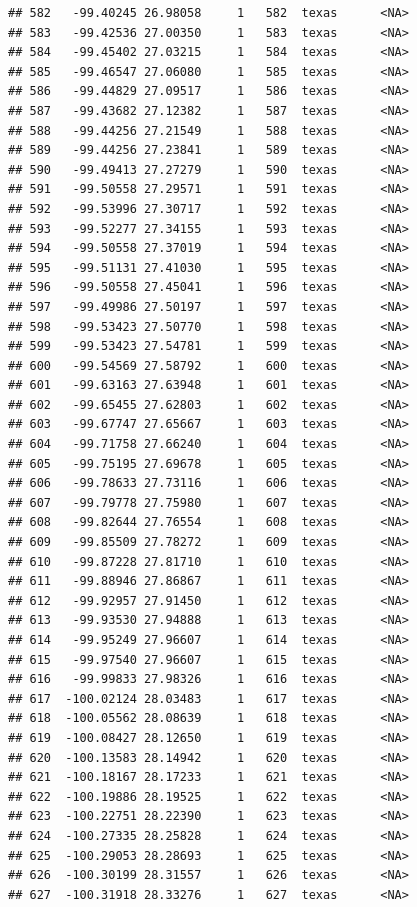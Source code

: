 \documentclass[
]{article}
\begin{document}
\begin{verbatim}
## 582   -99.40245 26.98058     1   582  texas      <NA>
## 583   -99.42536 27.00350     1   583  texas      <NA>
## 584   -99.45402 27.03215     1   584  texas      <NA>
## 585   -99.46547 27.06080     1   585  texas      <NA>
## 586   -99.44829 27.09517     1   586  texas      <NA>
## 587   -99.43682 27.12382     1   587  texas      <NA>
## 588   -99.44256 27.21549     1   588  texas      <NA>
## 589   -99.44256 27.23841     1   589  texas      <NA>
## 590   -99.49413 27.27279     1   590  texas      <NA>
## 591   -99.50558 27.29571     1   591  texas      <NA>
## 592   -99.53996 27.30717     1   592  texas      <NA>
## 593   -99.52277 27.34155     1   593  texas      <NA>
## 594   -99.50558 27.37019     1   594  texas      <NA>
## 595   -99.51131 27.41030     1   595  texas      <NA>
## 596   -99.50558 27.45041     1   596  texas      <NA>
## 597   -99.49986 27.50197     1   597  texas      <NA>
## 598   -99.53423 27.50770     1   598  texas      <NA>
## 599   -99.53423 27.54781     1   599  texas      <NA>
## 600   -99.54569 27.58792     1   600  texas      <NA>
## 601   -99.63163 27.63948     1   601  texas      <NA>
## 602   -99.65455 27.62803     1   602  texas      <NA>
## 603   -99.67747 27.65667     1   603  texas      <NA>
## 604   -99.71758 27.66240     1   604  texas      <NA>
## 605   -99.75195 27.69678     1   605  texas      <NA>
## 606   -99.78633 27.73116     1   606  texas      <NA>
## 607   -99.79778 27.75980     1   607  texas      <NA>
## 608   -99.82644 27.76554     1   608  texas      <NA>
## 609   -99.85509 27.78272     1   609  texas      <NA>
## 610   -99.87228 27.81710     1   610  texas      <NA>
## 611   -99.88946 27.86867     1   611  texas      <NA>
## 612   -99.92957 27.91450     1   612  texas      <NA>
## 613   -99.93530 27.94888     1   613  texas      <NA>
## 614   -99.95249 27.96607     1   614  texas      <NA>
## 615   -99.97540 27.96607     1   615  texas      <NA>
## 616   -99.99833 27.98326     1   616  texas      <NA>
## 617  -100.02124 28.03483     1   617  texas      <NA>
## 618  -100.05562 28.08639     1   618  texas      <NA>
## 619  -100.08427 28.12650     1   619  texas      <NA>
## 620  -100.13583 28.14942     1   620  texas      <NA>
## 621  -100.18167 28.17233     1   621  texas      <NA>
## 622  -100.19886 28.19525     1   622  texas      <NA>
## 623  -100.22751 28.22390     1   623  texas      <NA>
## 624  -100.27335 28.25828     1   624  texas      <NA>
## 625  -100.29053 28.28693     1   625  texas      <NA>
## 626  -100.30199 28.31557     1   626  texas      <NA>
## 627  -100.31918 28.33276     1   627  texas      <NA>

\end{verbatim}
\end{document}
